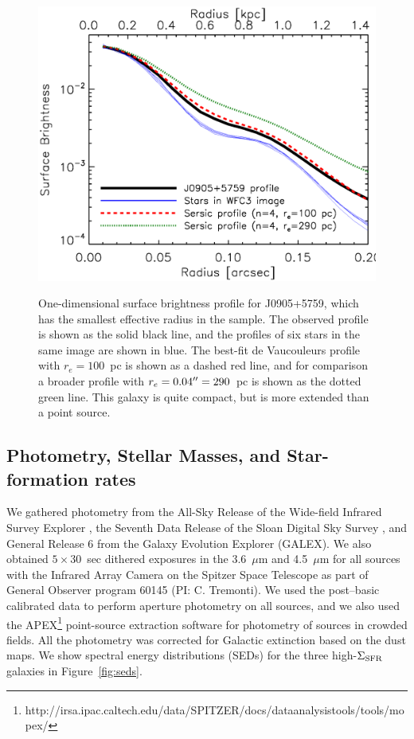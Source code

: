 \documentclass[apj]{emulateapj}
\newcommand{\sigmasfr}{\Sigma_{\textnormal{\scriptsize{SFR}}}}
\begin{document}
\begin{figure}[!t]
\includegraphics[angle=0,scale=0.41]{profile.ps}
\label{fig:profile}
\caption{One-dimensional surface brightness profile for J0905+5759,
  which has the smallest effective radius in the sample.  The observed
  profile is shown as the solid black line, and the profiles of six
  stars in the same image are shown in blue.  The best-fit de
  Vaucouleurs profile with $r_e=100$~pc is shown as a dashed red line,
  and for comparison a broader profile with $r_e=0.04\mbox{$^{\prime\prime}$}=290$~pc
  is shown as the dotted green line.  This galaxy is quite compact,
  but is more extended than a point source.}
\end{figure}



\subsection{Photometry, Stellar Masses, and Star-formation rates}

We gathered photometry from the All-Sky Release of the Wide-field
Infrared Survey Explorer \citep[WISE,][]{wri10}, the Seventh Data
Release of the Sloan Digital Sky Survey \citep[SDSS,][]{aba09}, and
General Release 6 from the Galaxy Evolution Explorer (GALEX).  We also
obtained $5\times30$~sec dithered exposures in the 3.6~$\mu$m and
4.5~$\mu$m for all sources with the Infrared Array Camera
\citep{faz04} on the Spitzer Space Telescope \citep{wer04} as part of
General Observer program 60145 (PI: C. Tremonti).  We used the
post--basic calibrated data to perform aperture photometry on all
sources, and we also used the
APEX\footnote{http://irsa.ipac.caltech.edu/data/SPITZER/docs/dataanalysistools/tools/mopex/}
point-source extraction software for photometry of sources in crowded
fields.  All the photometry was corrected for Galactic extinction
based on the \citet{sch98} dust maps.  We show spectral energy
distributions (SEDs) for the three high-$\sigmasfr$ galaxies in
Figure~\ref{fig:seds}.
\end{document}
